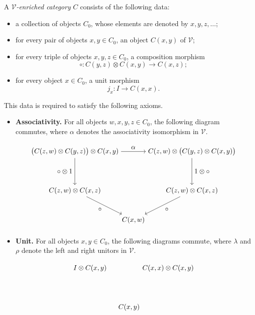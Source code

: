 \documentclass{tac}
\begin{document}
\begin{definition}
A \emph{$\mathcal{V}$-enriched category} $C$ consists of the following data:
\begin{itemize}
    \item a collection of objects $C_0$, whose elements are denoted by
    $x,y,z,\dots$;
    \item for every pair of objects $x,y\in C_0$, an object
    $C(x,y)$ of $\mathcal{V}$;
    \item for every triple of objects $x,y,z\in C_0$, a composition morphism
    \[
    \circ:C(y,z)\otimes C(x,y)\longrightarrow C(x,z);
    \]
    \item for every object $x\in C_0$, a unit morphism
    \[
    j_x:I\longrightarrow C(x,x).
    \]
\end{itemize}

This data is required to satisfy the following axioms.
\begin{itemize}
    \item \textbf{Associativity.}
    For all objects $w,x,y,z\in C_0$, the following diagram commutes,
    where $\alpha$ denotes the associativity isomorphism in $\mathcal V$.
    
    \[
    \begin{tikzpicture}
        \node (A) at (0,0)
        {$\bigl(C(z,w)\otimes C(y,z)\bigr)\otimes C(x,y)$};

        \node (B) at (6,0)
        {$C(z,w)\otimes\bigl(C(y,z)\otimes C(x,y)\bigr)$};

        \node (C) at (0,-2)
        {$C(z,w)\otimes C(x,z)$};

        \node (D) at (6,-2)
        {$C(z,w)\otimes C(x,z)$};

        \node (E) at (3,-3.5)
        {$C(x,w)$};

        \draw[->] (A) -- node[above] {$\alpha$} (B);
        \draw[->] (A) -- node[left] {$\circ\otimes 1$} (C);
        \draw[->] (B) -- node[right] {$1\otimes\circ$} (D);
        \draw[->] (C) -- node[below left] {$\circ$} (E);
        \draw[->] (D) -- node[below right] {$\circ$} (E);
    \end{tikzpicture}
    \]

    \item \textbf{Unit.}
    For all objects $x,y\in C_0$, the following diagrams commute, where
    $\lambda$ and $\rho$ denote the left and right unitors in $\mathcal V$.
    
    \[
    \begin{tikzpicture}
        \node (A) at (0,0) {$I\otimes C(x,y)$};
        \node (B) at (4,0) {$C(x,x)\otimes C(x,y)$};
        \node (C) at (2,-2) {$C(x,y)$};


\end{tikzpicture}\]
\end{itemize}
\end{definition}
\end{document}
